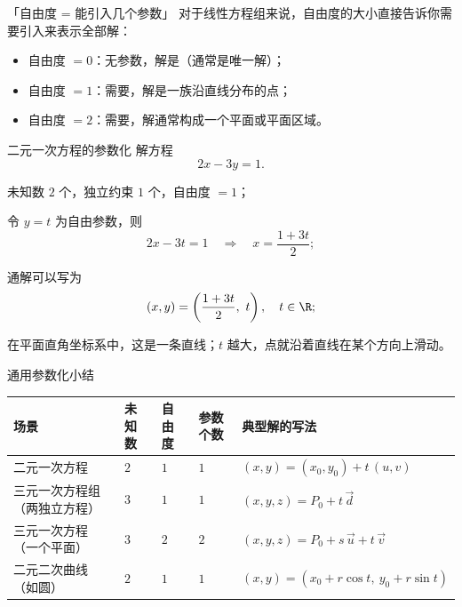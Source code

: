 \documentclass[a4paper,11pt]{ctexart}
\begin{document}
\begin{notebox}{「自由度 = 能引入几个参数」}
  对于线性方程组来说，自由度的大小直接告诉你需要引入来表示全部解：
  \begin{itemize}
    \item 自由度 $=0$：无参数，解是（通常是唯一解）；
    \item 自由度 $=1$：需要，解是一族沿直线分布的点；
    \item 自由度 $=2$：需要，解通常构成一个平面或平面区域。
  \end{itemize}
\end{notebox}

\begin{examplebox}{二元一次方程的参数化}
  解方程
  \[
    2x - 3y = 1.
  \]
  \begin{focuspoints}
    \item 未知数 $2$ 个，独立约束 $1$ 个，自由度 $=1$；
    \item 令 $y = t$ 为自由参数，则
          \[
            2x - 3t = 1 \quad\Rightarrow\quad x = \frac{1+3t}{2};
          \]
    \item 通解可以写为
          \[
            (x,y) = \left(\frac{1+3t}{2},\ t\right),\quad t\in\R;
          \]
    \item 在平面直角坐标系中，这是一条直线；$t$ 越大，点就沿着直线在某个方向上滑动。
  \end{focuspoints}
\end{examplebox}

\begin{summarybox}{通用参数化小结}
  \renewcommand{\arraystretch}{1.3}
  \begin{tabularx}{0.98\textwidth}{l>{\centering\arraybackslash}p{1.9cm}>{\centering\arraybackslash}p{1.9cm}>{\centering\arraybackslash}p{1.9cm}X}
    \toprule
    场景 & 未知数 & 自由度 & 参数个数 & 典型解的写法 \\
    \midrule
    二元一次方程 & $2$ & $1$ & $1$ & $(x,y) = (x_0,y_0) + t\,(u,v)$ \\
    三元一次方程组（两独立方程） & $3$ & $1$ & $1$ & $(x,y,z) = P_0 + t\,\vec{d}$ \\
    三元一次方程（一个平面） & $3$ & $2$ & $2$ & $(x,y,z) = P_0 + s\,\vec{u} + t\,\vec{v}$ \\
    二元二次曲线（如圆） & $2$ & $1$ & $1$ & $(x,y) = (x_0 + r\cos t,\ y_0 + r\sin t)$ \\
    \bottomrule
  \end{tabularx}
\end{summarybox}
\end{document}
